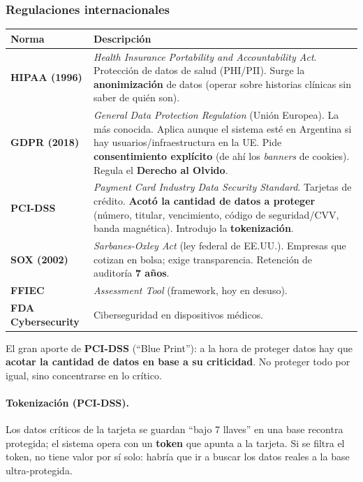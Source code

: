 \documentclass[../main.tex]{subfiles}
\begin{document}
\subsubsection{Regulaciones internacionales}
\begin{center}
\begin{tabular}{@{}>{\bfseries}l p{10.5cm}@{}}
\toprule
Norma & Descripción \\
\midrule
HIPAA (1996) & \emph{Health Insurance Portability and Accountability Act}. Protección
  de datos de salud (PHI/PII). Surge la \textbf{anonimización} de datos (operar sobre
  historias clínicas sin saber de quién son). \\
GDPR (2018) & \emph{General Data Protection Regulation} (Unión Europea). La más conocida.
  Aplica aunque el sistema esté en Argentina si hay usuarios/infraestructura en la UE.
  Pide \textbf{consentimiento explícito} (de ahí los \emph{banners} de cookies). Regula
  el \textbf{Derecho al Olvido}. \\
PCI-DSS & \emph{Payment Card Industry Data Security Standard}. Tarjetas de crédito.
  \textbf{Acotó la cantidad de datos a proteger} (número, titular, vencimiento, código
  de seguridad/CVV, banda magnética). Introdujo la \textbf{tokenización}. \\
SOX (2002) & \emph{Sarbanes-Oxley Act} (ley federal de EE.UU.). Empresas que cotizan
  en bolsa; exige transparencia. Retención de auditoría \textbf{7 años}. \\
FFIEC & \emph{Assessment Tool} (framework, hoy en desuso). \\
FDA Cybersecurity & Ciberseguridad en dispositivos médicos. \\
\bottomrule
\end{tabular}
\end{center}

\begin{destacado}
El gran aporte de \textbf{PCI-DSS} (``Blue Print''): a la hora de proteger datos hay
que \textbf{acotar la cantidad de datos en base a su criticidad}. No proteger todo por
igual, sino concentrarse en lo crítico.
\end{destacado}

\paragraph{Tokenización (PCI-DSS).} Los datos críticos de la tarjeta se guardan ``bajo
7 llaves'' en una base recontra protegida; el sistema opera con un \textbf{token} que
apunta a la tarjeta. Si se filtra el token, no tiene valor por sí solo: habría que ir
a buscar los datos reales a la base ultra-protegida.
\end{document}

